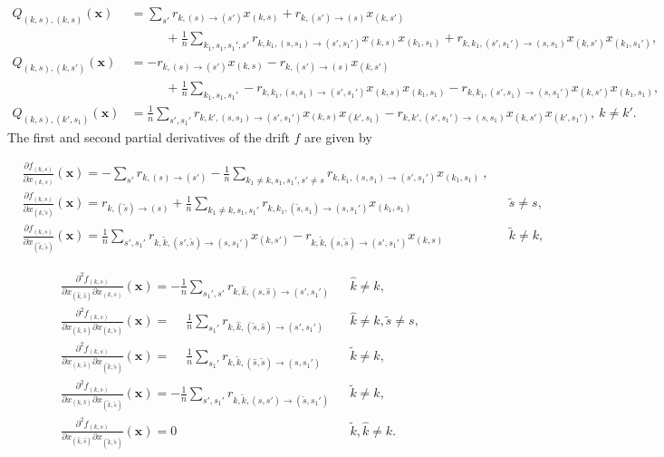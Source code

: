 \documentclass[acmsmall]{acmart}
\newcommand\bx{\mathbf{x}}
\begin{document}
\begin{align*}
Q_{(k,s),(k,s)}(\bx) &{=} \sum_{s'}r_{k,(s)\rightarrow (s')}x_{(k,s)} {+} r_{k,(s')\rightarrow (s)}x_{(k,s')} \\ 
& \phantom{+++} {+} \frac1n \!\!\sum_{k_1, s_1,s_1',s'}\!\!\!\! r_{k,k_1,(s,s_1)\rightarrow (s',s_1')}x_{(k,s)}x_{(k_1,s_1)} {+} r_{k,k_1,(s',s_1')\rightarrow (s,s_1)}x_{(k,s')}x_{(k_1,s_1')}, \\
Q_{(k,s),(k,s')}(\bx) &{=} {-} r_{k,(s)\rightarrow (s')}x_{(k,s)} {-} r_{k,(s') \rightarrow (s)}x_{(k,s')} \\
& \phantom{+++} {+} \frac1n \!\sum_{k_1,s_1,s_1'}\!\!\!\!- r_{k,k_1,(s,s_1)\rightarrow (s',s_1')}x_{(k,s)}x_{(k_1,s_1)} {-} r_{k,k_1,(s',s_1) \rightarrow (s,s_1')}x_{(k,s')}x_{(k_1,s_1)}, \\
Q_{(k,s),(k',s_1)}(\bx) &{=} \frac1n \sum_{s',s_1'} r_{k,k',(s,s_1) \rightarrow (s',s_1')}x_{(k,s)}x_{(k',s_1)} - r_{k,k',(s',s_1') \rightarrow (s,s_1)}x_{(k,s')}x_{(k',s_1')}, \ k \ne k'.
\end{align*} 
The first and second partial derivatives of the drift $f$ are given by

\begin{align*}
& \frac{\partial f_{(k,s)}}{\partial x_{(k,s)}}(\bx) = {-} \sum_{s'} r_{k,(s)\rightarrow(s')} {-} \frac1n \sum_{k_1\ne k, s_1, s_1', s'\neq s} r_{k,k_1, (s, s_1)\rightarrow (s', s_1')}x_{(k_1,s_1)} \ , \\
& \frac{\partial f_{(k,s)}}{\partial x_{(k,\tilde{s})}}(\bx) = r_{k,(\tilde{s})\rightarrow (s)} +\frac1n \sum_{k_1 \ne k,s_1,s_1'} r_{k,k_1,(\tilde{s},s_1)\rightarrow (s ,s_1')}x_{(k_1,s_1)} && \tilde{s} \ne s, \\
& \frac{\partial f_{(k,s)}}{\partial x_{(\tilde{k},\tilde{s})}}(\bx) = \frac1n\sum_{s',s_1'} r_{k,\tilde{k},(s',\tilde{s})\rightarrow(s,s_1')}x_{(k,s')} {-} r_{k,\tilde{k},(s,\tilde{s})\rightarrow (s',s_1')}x_{(k,s)} && \tilde{k} \ne k,
\end{align*}

\begin{align*}
& \frac{\partial^2 f_{(k,s)}}{\partial x_{(\hat{k},\hat{s})} \partial x_{(k,s)}}(\bx) = {-} \frac1n \sum_{s_1', s'} r_{k,\hat{k}, (s, \hat{s}) \rightarrow (s', s_1')} && \hat{k} \ne k,\\
& \frac{\partial^2 f_{(k,s)}}{\partial x_{(\hat{k},\hat{s})} \partial x_{(k,\tilde{s})}}(\bx) = \phantom{-}\frac1n \sum_{s_1'} r_{k,\hat{k}, (\tilde{s}, \hat{s})\rightarrow (s', s_1')} && \hat{k} \ne k,\tilde{s} \ne s, \\
& \frac{\partial^2 f_{(k,s)}}{\partial x_{(k,\hat{s})} \partial x_{(\tilde{k},\tilde{s})}}(\bx) = \phantom{-}\frac1n \sum_{s_1'} r_{k,\tilde{k}, (\hat{s}, \tilde{s})\rightarrow (s, s_1')} && \tilde{k} \ne k,\\ 
& \frac{\partial^2 f_{(k,s)}}{\partial x_{(k,\hat{s})} \partial x_{(\tilde{k},\tilde{s})}}(\bx) = {-} \frac1n \sum_{s', s_1'} r_{k,\tilde{k}, (s, s') \rightarrow (\tilde{s}, s_1')} && \tilde{k} \ne k,\\
& \frac{\partial^2 f_{(k,s)}}{\partial x_{(\hat{k},\hat{s})} \partial x_{(\tilde{k},\tilde{s})}}(\bx) = 0 && \tilde{k}, \hat{k} \ne k.
\end{align*}
\end{document}
